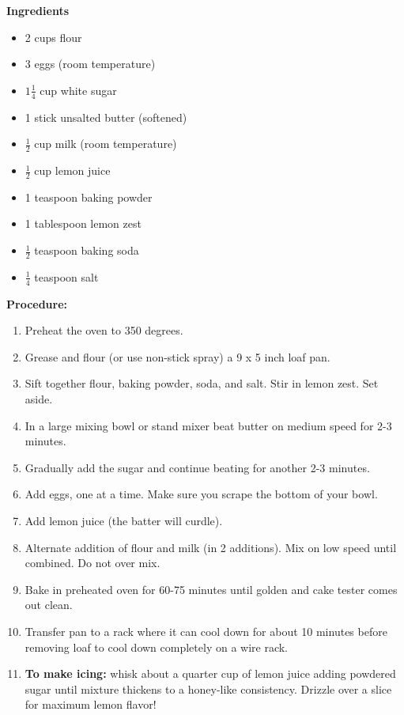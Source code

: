 \begin{multicols}{2}
\textbf{Ingredients} 
\begin{itemize}
\item 2 cups flour
\item 3 eggs (room temperature)  
\item $1\frac{1}{4}$ cup white sugar 
\item 1 stick unsalted butter (softened)
\item $\frac{1}{2}$ cup milk (room temperature)
\item $\frac{1}{2}$ cup lemon juice 
\item 1 teaspoon baking powder
\item 1 tablespoon lemon zest
\item $\frac{1}{2}$ teaspoon baking soda 
\item $\frac{1}{4}$ teaspoon salt




\end{itemize}


\columnbreak
\textbf{Procedure:}
\medskip


\begin{enumerate}
\item Preheat the oven to 350 degrees. 


\medskip
\item Grease and flour (or use non-stick spray) a 9 x 5 inch loaf pan.
\medskip

\item Sift together flour, baking powder, soda, and salt. Stir in lemon zest. Set aside.


\item In a large mixing bowl or stand mixer beat butter on medium speed for 2-3 minutes.
\medskip 
\item Gradually add the sugar and continue beating for another 2-3 minutes.
\medskip 
\item Add eggs, one at a time. Make sure you scrape the bottom of your bowl.
\medskip
\item Add lemon juice (the batter will curdle).
\medskip
\item Alternate addition of flour and milk (in 2 additions). Mix on low speed until combined. Do not over mix.
\medskip
\item Bake in preheated oven for 60-75 minutes until golden and cake tester comes out clean.
\medskip
\item Transfer pan to a rack where it can cool down for about 10 minutes before removing loaf to cool down completely on a wire rack.
\medskip \item \textbf{To make icing:} whisk about a quarter cup of lemon juice adding powdered sugar until mixture thickens to a honey-like consistency. Drizzle over a slice for maximum lemon flavor! 
\end{enumerate}

\end{multicols}